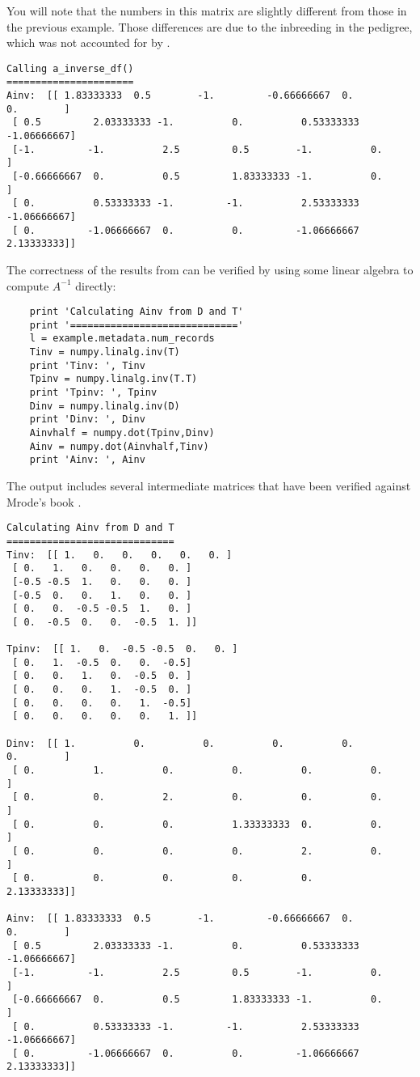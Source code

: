 You will note that the numbers in this matrix are slightly different from those in the previous example. Those differences are due to the inbreeding in the pedigree, which was not accounted for by .
\begin{verbatim}
Calling a_inverse_df()
======================
Ainv:  [[ 1.83333333  0.5        -1.         -0.66666667  0.          0.        ]
 [ 0.5         2.03333333 -1.          0.          0.53333333 -1.06666667]
 [-1.         -1.          2.5         0.5        -1.          0.        ]
 [-0.66666667  0.          0.5         1.83333333 -1.          0.        ]
 [ 0.          0.53333333 -1.         -1.          2.53333333 -1.06666667]
 [ 0.         -1.06666667  0.          0.         -1.06666667  2.13333333]]
\end{verbatim}
The correctness of the results from \function{} can be verified by using some linear algebra to compute $A^{-1}$ directly:
\begin{verbatim}
    print 'Calculating Ainv from D and T'
    print '============================='
    l = example.metadata.num_records
    Tinv = numpy.linalg.inv(T)
    print 'Tinv: ', Tinv
    Tpinv = numpy.linalg.inv(T.T)
    print 'Tpinv: ', Tpinv
    Dinv = numpy.linalg.inv(D)
    print 'Dinv: ', Dinv
    Ainvhalf = numpy.dot(Tpinv,Dinv)
    Ainv = numpy.dot(Ainvhalf,Tinv)
    print 'Ainv: ', Ainv
\end{verbatim}
The output includes several intermediate matrices that have been verified against Mrode's book \cite{ref224}.
\begin{verbatim}
Calculating Ainv from D and T
=============================
Tinv:  [[ 1.   0.   0.   0.   0.   0. ]
 [ 0.   1.   0.   0.   0.   0. ]
 [-0.5 -0.5  1.   0.   0.   0. ]
 [-0.5  0.   0.   1.   0.   0. ]
 [ 0.   0.  -0.5 -0.5  1.   0. ]
 [ 0.  -0.5  0.   0.  -0.5  1. ]]

Tpinv:  [[ 1.   0.  -0.5 -0.5  0.   0. ]
 [ 0.   1.  -0.5  0.   0.  -0.5]
 [ 0.   0.   1.   0.  -0.5  0. ]
 [ 0.   0.   0.   1.  -0.5  0. ]
 [ 0.   0.   0.   0.   1.  -0.5]
 [ 0.   0.   0.   0.   0.   1. ]]

Dinv:  [[ 1.          0.          0.          0.          0.          0.        ]
 [ 0.          1.          0.          0.          0.          0.        ]
 [ 0.          0.          2.          0.          0.          0.        ]
 [ 0.          0.          0.          1.33333333  0.          0.        ]
 [ 0.          0.          0.          0.          2.          0.        ]
 [ 0.          0.          0.          0.          0.          2.13333333]]

Ainv:  [[ 1.83333333  0.5        -1.         -0.66666667  0.          0.        ]
 [ 0.5         2.03333333 -1.          0.          0.53333333 -1.06666667]
 [-1.         -1.          2.5         0.5        -1.          0.        ]
 [-0.66666667  0.          0.5         1.83333333 -1.          0.        ]
 [ 0.          0.53333333 -1.         -1.          2.53333333 -1.06666667]
 [ 0.         -1.06666667  0.          0.         -1.06666667  2.13333333]]
\end{verbatim}
